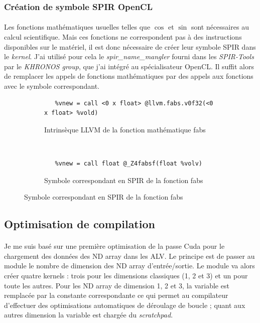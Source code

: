 \subsubsection{Création de symbole SPIR OpenCL}
\paragraph{}
Les fonctions mathématiques usuelles telles que $\cos$ et $\sin$ sont
nécessaires au calcul scientifique. Mais ces fonctions ne correspondent pas à
des instructions disponibles sur le matériel, il est donc nécessaire de créer
leur symbole SPIR dans le \emph{kernel}. J'ai utilisé pour cela le
\emph{spir\_name\_mangler} fourni dans les \emph{SPIR-Tools} par le
\emph{KHRONOS group}, que j'ai intégré au spécialisateur OpenCL. Il suffit alors
de remplacer les appels de fonctions mathématiques par des appels aux fonctions
avec le symbole correspondant.

\begin{figure}[h!]
   \begin{subfigure}{135mm}
      \begin{lstlisting}
   %vnew = call <0 x float> @llvm.fabs.v0f32(<0 x float> %vold)
      \end{lstlisting}
      \caption{Intrinsèque LLVM de la fonction mathématique fabs}
   \end{subfigure}
   \\[5mm]
   \begin{subfigure}{135mm}
      \begin{lstlisting}
   %vnew = call float @_Z4fabsf(float %volv)
      \end{lstlisting}
      \caption{Symbole correspondant en SPIR de la fonction fabs}
   \end{subfigure}
\end{figure}

\subsection{Optimisation de compilation}
\paragraph{}
Je me suis basé sur une première optimisation de la passe Cuda pour le
chargement des données des ND array dans les ALV. Le principe est de passer au
module le nombre de dimension des ND array d'entrée/sortie. Le module va alors
créer quatre kernels : trois pour les dimensions classiques (1, 2 et 3) et un
pour toute les autres. Pour les ND array de dimension 1, 2 et 3, la variable est
remplacée par la constante correspondante ce qui permet au compilateur
d'effectuer des optimisations automatiques de déroulage de boucle ; quant aux
autres dimension la variable est chargée du \emph{scratchpad}.


